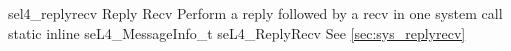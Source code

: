 %
%
%
%

\apidoc
{sel4_replyrecv}
{Reply Recv}
{Perform a reply followed by a recv in one system call}
{static inline seL4\_MessageInfo\_t seL4\_ReplyRecv}
{
}
{\messageinforetdesc}
{See \autoref{sec:sys_replyrecv}}
